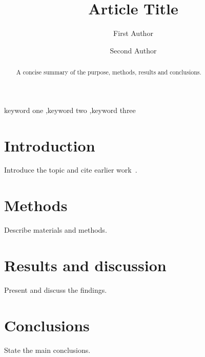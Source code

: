 \documentclass[preprint,12pt]{elsarticle}
\begin{document}
\begin{frontmatter}
\title{Article Title}

\author[inst1]{First Author}
\author[inst2]{Second Author}

\address[inst1]{Department, University, City, Country}
\address[inst2]{Institute, City, Country}

\begin{abstract}
A concise summary of the purpose, methods, results and conclusions.
\end{abstract}

\begin{keyword}
keyword one \sep keyword two \sep keyword three
\end{keyword}
\end{frontmatter}

\section{Introduction}
\label{sec:intro}
Introduce the topic and cite earlier work~\cite{example2024}.

\section{Methods}
Describe materials and methods.

\section{Results and discussion}
Present and discuss the findings.

\section{Conclusions}
State the main conclusions.



\end{document}
